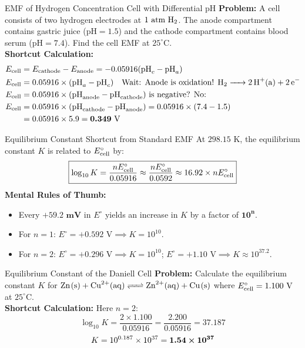 \documentclass[11pt,a4paper]{report}
\newcommand{\ans}[1]{\ifmmode\bm{#1}\else\textbf{#1}\fi}
\begin{document}
\begin{microbox}{EMF of Hydrogen Concentration Cell with Differential pH}
\textbf{Problem:} A cell consists of two hydrogen electrodes at $1\text{ atm } \ce{H2}$. The anode compartment contains gastric juice ($\mathrm{pH} = 1.5$) and the cathode compartment contains blood serum ($\mathrm{pH} = 7.4$). Find the cell EMF at $25^\circ\text{C}$.\\
\textbf{Shortcut Calculation:}
\begin{align*}
E_{\rm cell} &= E_{\rm cathode} - E_{\rm anode} = -0.05916(\mathrm{pH}_c - \mathrm{pH}_a) \\
E_{\rm cell} &= 0.05916 \times (\mathrm{pH}_a - \mathrm{pH}_c) \quad \text{Wait: Anode is oxidation! } \ce{H2 -> 2H+(a) + 2e^-} \\
E_{\rm cell} &= 0.05916 \times (\mathrm{pH}_{\rm anode} - \mathrm{pH}_{\rm cathode}) \text{ is negative? No: } \\
E_{\rm cell} &= 0.05916 \times (\mathrm{pH}_{\rm cathode} - \mathrm{pH}_{\rm anode}) = 0.05916 \times (7.4 - 1.5) \\
&= 0.05916 \times 5.9 = \ans{0.349\text{ V}}
\end{align*}
\end{microbox}

\begin{shortcutbox}{Equilibrium Constant Shortcut from Standard EMF}
At $298.15\text{ K}$, the equilibrium constant $K$ is related to $E^\circ_{\rm cell}$ by:
\begin{equation}
\boxed{
\log_{10} K = \frac{n E^\circ_{\rm cell}}{0.05916} \approx \frac{n E^\circ_{\rm cell}}{0.0592} \approx 16.92 \times n E^\circ_{\rm cell}
}
\end{equation}
\textbf{Mental Rules of Thumb:}
\begin{itemize}
    \item Every $\bm{+59.2\text{ mV}}$ in $E^\circ$ yields an increase in $K$ by a factor of $\bm{10^n}$.
    \item For $n = 1$: $E^\circ = +0.592\text{ V} \implies K = 10^{10}$.
    \item For $n = 2$: $E^\circ = +0.296\text{ V} \implies K = 10^{10}$; $E^\circ = +1.10\text{ V} \implies K \approx 10^{37.2}$.
\end{itemize}
\end{shortcutbox}

\begin{microbox}{Equilibrium Constant of the Daniell Cell}
\textbf{Problem:} Calculate the equilibrium constant $K$ for $\ce{Zn(s) + Cu^{2+}(aq) <=> Zn^{2+}(aq) + Cu(s)}$ where $E^\circ_{\rm cell} = 1.100\text{ V}$ at $25^\circ\text{C}$.\\
\textbf{Shortcut Calculation:}
Here $n = 2$:
$$\log_{10} K = \frac{2 \times 1.100}{0.05916} = \frac{2.200}{0.05916} = 37.187$$
$$K = 10^{0.187} \times 10^{37} = \ans{1.54 \times 10^{37}}$$
\end{microbox}
\end{document}
